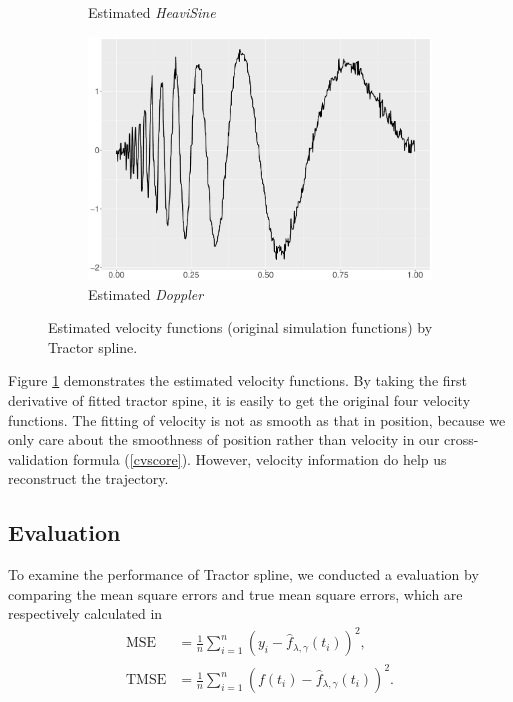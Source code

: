 \begin{figure}
\begin{subfigure}{0.45\textwidth}
    \caption{Estimated \textit{HeaviSine}  }
    \end{subfigure}
    \begin{subfigure}{0.45\textwidth}
    \centering
    \includegraphics[width=\linewidth,height=0.45\textwidth]{Chapters/02TractorSplineTheory/plot/ggplot/ggDopplerTractorVelocity.pdf}
    \caption{Estimated \textit{Doppler}  }
    \end{subfigure}
\caption{Estimated velocity functions (original simulation functions) by Tractor spline.}\label{numvtractor}
 \end{figure}



Figure \ref{numvtractor} demonstrates the estimated velocity functions. By taking the first derivative of fitted tractor spine, it is easily to get the original four velocity functions. The fitting of velocity is not as smooth as that in position, because we only care about the smoothness of position rather than velocity in our cross-validation formula (\ref{cvscore}). However, velocity information do help us reconstruct the trajectory.



\subsection{Evaluation}
To examine the performance of Tractor spline, we conducted a evaluation by comparing the mean square errors and true mean square errors, which are respectively calculated in
\begin{align}
\mbox{MSE}&= \frac{1}{n} \sum_{i=1}^{n} (y_i-\hat{f}_{\lambda,\gamma}(t_i))^2,\\
\mbox{TMSE}&= \frac{1}{n} \sum_{i=1}^{n} (f(t_i)-\hat{f}_{\lambda,\gamma}(t_i))^2.
\end{align}



